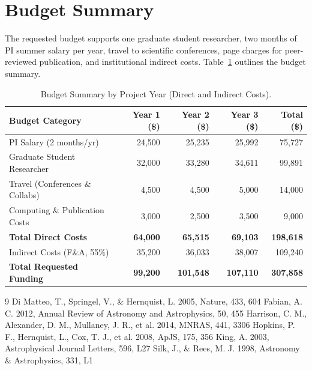 \section{Budget Summary}
The requested budget supports one graduate student researcher, two months of PI summer salary per year, travel to scientific conferences, page charges for peer-reviewed publication, and institutional indirect costs. Table~\ref{tab:budget} outlines the budget summary.

\begin{table}[htbp]
  \centering
  \caption{Budget Summary by Project Year (Direct and Indirect Costs).}
  \label{tab:budget}
  \small
  \begin{tabular}{lrrrr}
    \toprule
    \textbf{Budget Category} & \textbf{Year 1 (\$)} & \textbf{Year 2 (\$)} & \textbf{Year 3 (\$)} & \textbf{Total (\$)} \\
    \midrule
    PI Salary (2 months/yr) & 24,500 & 25,235 & 25,992 & 75,727 \\
    Graduate Student Researcher & 32,000 & 33,280 & 34,611 & 99,891 \\
    Travel (Conferences \& Collabs) & 4,500 & 4,500 & 5,000 & 14,000 \\
    Computing \& Publication Costs & 3,000 & 2,500 & 3,500 & 9,000 \\
    \midrule
    \textbf{Total Direct Costs} & \textbf{64,000} & \textbf{65,515} & \textbf{69,103} & \textbf{198,618} \\
    Indirect Costs (F\&A, 55\%) & 35,200 & 36,033 & 38,007 & 109,240 \\
    \midrule
    \textbf{Total Requested Funding} & \textbf{99,200} & \textbf{101,548} & \textbf{107,110} & \textbf{307,858} \\
    \bottomrule
  \end{tabular}
\end{table}

\begin{thebibliography}{9}
   Di Matteo, T., Springel, V., \& Hernquist, L. 2005, Nature, 433, 604
   Fabian, A. C. 2012, Annual Review of Astronomy and Astrophysics, 50, 455
   Harrison, C. M., Alexander, D. M., Mullaney, J. R., et al. 2014, MNRAS, 441, 3306
   Hopkins, P. F., Hernquist, L., Cox, T. J., et al. 2008, ApJS, 175, 356
   King, A. 2003, Astrophysical Journal Letters, 596, L27
   Silk, J., \& Rees, M. J. 1998, Astronomy \& Astrophysics, 331, L1
\end{thebibliography}
